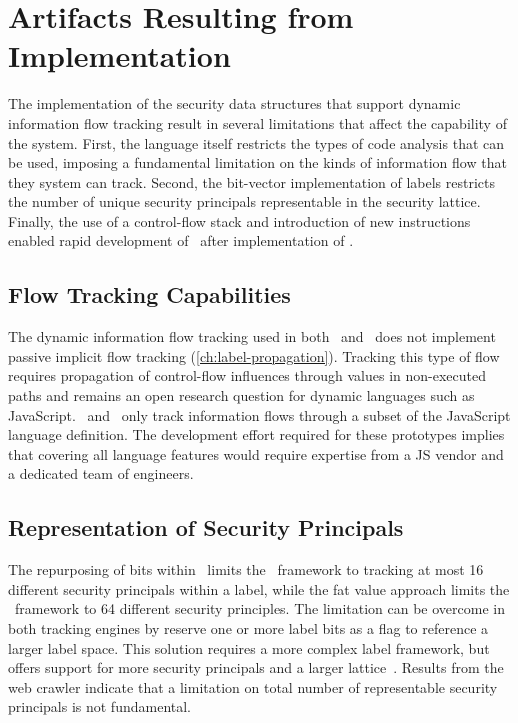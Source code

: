 \section{Artifacts Resulting from Implementation}

The implementation of the security data structures that support dynamic information flow tracking result in several limitations that affect the capability of the system.
First, the language itself restricts the types of code analysis that can be used, imposing a fundamental limitation on the kinds of information flow that they system can track.
Second, the bit-vector implementation of labels restricts the number of unique security principals representable in the security lattice.
Finally, the use of a control-flow stack and introduction of new instructions enabled rapid development of \JitFlow\ after implementation of \FlowCore.

\subsection{Flow Tracking Capabilities}

The dynamic information flow tracking used in both \FlowCore\ and \JitFlow\ does not implement passive implicit flow tracking (\autoref{ch:label-propagation}).
Tracking this type of flow requires propagation of control-flow influences through values in non-executed paths and remains an open research question for dynamic languages such as JavaScript.
\FlowCore\ and \JitFlow\ only track information flows through a subset of the JavaScript language definition.
The development effort required for these prototypes implies that covering all language features would require expertise from a JS vendor and a dedicated team of engineers.

\subsection{Representation of Security Principals}

The repurposing of bits within \jsvalues\ limits the \JitFlow\ framework to tracking at most 16 different security principals within a label, while the fat value approach limits the \FlowCore\ framework to 64 different security principles.
The limitation can be overcome in both tracking engines by reserve one or more label bits as a flag to reference a larger label space.
This solution requires a more complex label framework, but offers support for more security principals and a larger lattice~\cite{kerschbaumer.etal+13}.
Results from the web crawler indicate that a limitation on total number of representable security principals is not fundamental.

